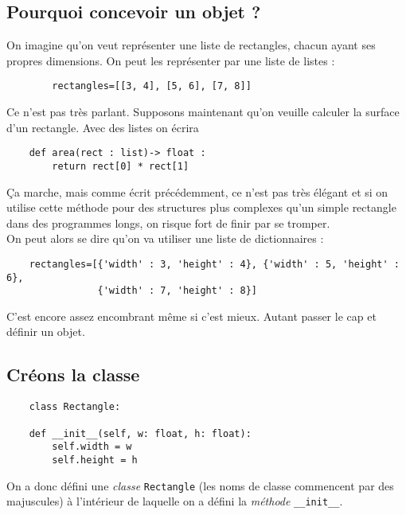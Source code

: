 \documentclass[a4paper,10pt,cours,firamath]{nsi}
\begin{document}
\subsection{Pourquoi concevoir un objet ?}
On imagine qu'on veut représenter une liste de rectangles, chacun ayant ses propres dimensions. On peut les représenter par une liste de listes :
\begin{pyc}
    \begin{verbatim}
        rectangles=[[3, 4], [5, 6], [7, 8]]
    \end{verbatim}
    
\end{pyc}
Ce n'est pas très parlant. 
Supposons maintenant qu'on veuille calculer la surface d'un rectangle. Avec des listes on écrira
\begin{pyc}
    \begin{verbatim}
    def area(rect : list)-> float :
        return rect[0] * rect[1]
    \end{verbatim}
\end{pyc}
Ça marche, mais comme écrit précédemment, ce n'est pas très élégant et si on utilise cette méthode pour des structures plus complexes qu'un simple rectangle dans des programmes longs, on risque fort de finir par se tromper.\\

On peut alors se dire qu'on va utiliser une liste de dictionnaires :
\begin{pyc}
    \begin{verbatim}
    rectangles=[{'width' : 3, 'height' : 4}, {'width' : 5, 'height' : 6}, 
                {'width' : 7, 'height' : 8}]
    \end{verbatim}
\end{pyc}

C'est encore assez encombrant même si c'est mieux. Autant passer le cap et définir un objet.
\subsection{Créons la classe}

\begin{pyc}
    \begin{verbatim}
    class Rectangle:
    
    def __init__(self, w: float, h: float):
        self.width = w
        self.height = h
    \end{verbatim}
\end{pyc}

On a donc défini une \textit{classe} \texttt{Rectangle} (les noms de classe commencent par des majuscules) à l'intérieur de laquelle on a défini la \textit{méthode} \texttt{__init__}.\\
\end{document}
